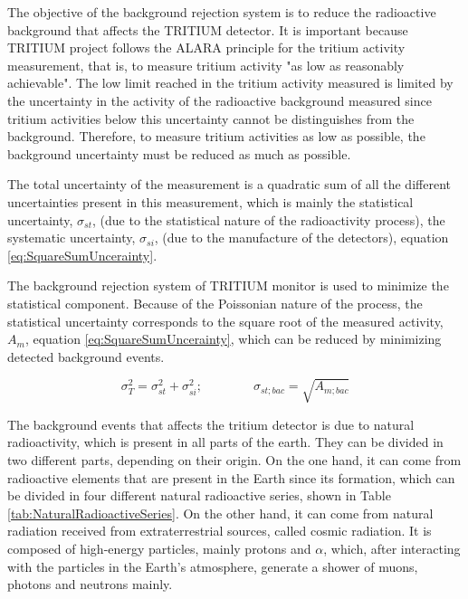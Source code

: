 The objective of the background rejection system is to reduce the radioactive background that affects the TRITIUM detector. It is important because TRITIUM project follows the ALARA principle for the tritium activity measurement, that is, to measure tritium activity "as low as reasonably achievable". The low limit reached in the tritium activity measured is limited by the uncertainty in the activity of the radioactive background measured since tritium activities below this uncertainty cannot be distinguishes  from the background. Therefore, to measure tritium activities as low as possible, the background uncertainty must be reduced as much as possible.

The total uncertainty of the measurement is a quadratic sum of all the different uncertainties present in this measurement, which is mainly the statistical uncertainty, $\sigma_{st}$, (due to the statistical nature of the radioactivity process), the systematic uncertainty, $\sigma_{si}$, (due to the manufacture of the detectors), equation \ref{eq:SquareSumUncerainty}.

The background rejection system of TRITIUM monitor is used to minimize the statistical component. Because of the Poissonian nature of the process, the statistical uncertainty corresponds to the square root of the measured activity, $A_{m}$, equation \ref{eq:SquareSumUncerainty}, which can be reduced by minimizing detected background events.

\begin{equation}
\sigma_{T}^2 = \sigma_{st}^2 +\sigma_{si}^2; \qquad \qquad \sigma_{st;bac} = \sqrt{A_{m;bac}}
\label{eq:SquareSumUncerainty}
\end{equation} 

The background events that affects the tritium detector is due to natural radioactivity, which is present in all parts of the earth. They can be divided in two different parts, depending on their origin. On the one hand, it can come from radioactive elements that are present in the Earth since its formation, which can be divided in four different natural radioactive series, shown in Table \ref{tab:NaturalRadioactiveSeries}. On the other hand, it can come from natural radiation received from extraterrestrial sources, called cosmic radiation. It is composed of high-energy particles, mainly protons and $\alpha$, which, after interacting with the particles in the Earth's atmosphere, generate a shower of muons, photons and neutrons mainly.


